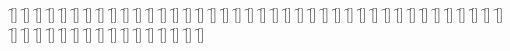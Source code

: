\begin{questions}
\begin{multicols}{2}
        \question  \f[]
        \question  \f[]
        \question  \f[]
        \question  \f[]
        \question  \f[]
        \question  \f[]
        \question  \f[]
        \question  \f[]
        \question  \f[]
        \question  \f[]
        \question  \f[]
        \question  \f[]
        \question  \f[]
        \question  \f[]
        \question  \f[]
        \question  \f[]
        \question  \f[]
        \question  \f[]
        \question  \f[]
        \question  \f[]
        \question  \f[]
        \question  \f[]
        \question  \f[]
        \question  \f[]
        \question  \f[]
        \question  \f[]
        \question  \f[]
        \question  \f[]
        \question  \f[]
        \question  \f[]
        \question  \f[]
        \question  \f[]
        \question  \f[]
        \question  \f[]
        \question  \f[]
        \question  \f[]
        \question  \f[]
        \question  \f[]
        \question  \f[]
        \question  \f[]
        \question  \f[]
        \question  \f[]
        \question  \f[]
        \question  \f[]
        \question  \f[]
        \question  \f[]
        \question  \f[]
        \question  \f[]
        \question  \f[]
        \question  \f[]
        \question  \f[]
        \question  \f[]
        \question  \f[]
        \question  \f[]
        \question  \f[]
        \question  \f[]
    \end{multicols}
\end{questions}
